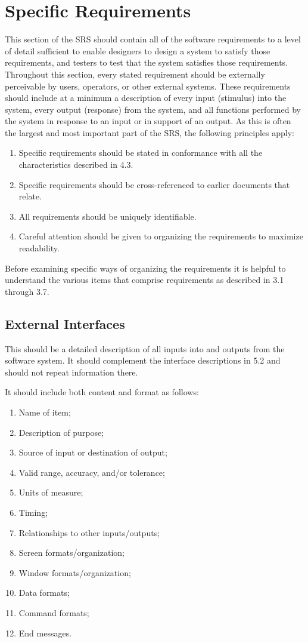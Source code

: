 \documentclass[draftclsnofoot,onecolumn,10pt]{IEEEtran}
\begin{document}
\section{Specific Requirements}
This section of the SRS should contain all of the software requirements to a
level of detail sufficient to enable designers to design a system to satisfy
those requirements, and testers to test that the system satisfies those
requirements. Throughout this section, every stated requirement should be
externally perceivable by users, operators, or other external systems. These
requirements should include at a minimum a description of every input (stimulus)
into the system, every output (response) from the system, and all functions
performed by the system in response to an input or in support of an output. As
this is often the largest and most important part of the SRS, the following
principles apply:
\begin{enumerate}
	\item Specific requirements should be stated in conformance with all the
		characteristics described in 4.3.
	\item Specific requirements should be cross-referenced to earlier documents
		that relate.
	\item All requirements should be uniquely identifiable.
	\item Careful attention should be given to organizing the requirements to
		maximize readability.
\end{enumerate}

Before examining specific ways of organizing the requirements it is helpful to
understand the various items that comprise requirements as described in 3.1
through 3.7.

\subsection{External Interfaces}

This should be a detailed description of all inputs into and outputs from the
software system. It should complement the interface descriptions in 5.2 and
should not repeat information there.

It should include both content and format as follows:
\begin{enumerate}
	\item Name of item;
	\item Description of purpose;
	\item Source of input or destination of output;
	\item Valid range, accuracy, and/or tolerance;
	\item Units of measure;
	\item Timing;
	\item Relationships to other inputs/outputs;
	\item Screen formats/organization;
	\item Window formats/organization;
	\item Data formats;
	\item Command formats;
	\item End messages.
\end{enumerate}
\end{document}
